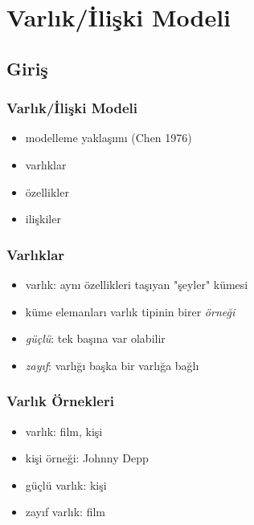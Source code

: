 \documentclass[dvipsnames]{beamer}
\theoremstyle{theorem}
\begin{document}
\section{Varlık/İlişki Modeli}

\subsection{Giriş}

\begin{frame}
  \frametitle{Varlık/İlişki Modeli}

  \begin{itemize}
    \item modelleme yaklaşımı (Chen 1976)

    \medskip
      \item varlıklar
      \item özellikler
      \item ilişkiler
  \end{itemize}
\end{frame}

\begin{frame}
  \frametitle{Varlıklar}

  \begin{itemize}
    \item \alert{varlık}: aynı özellikleri taşıyan "şeyler" kümesi
    \item küme elemanları varlık tipinin birer \emph{örneği}

    \medskip
    \item \emph{güçlü}: tek başına var olabilir
    \item \emph{zayıf}: varlığı başka bir varlığa bağlı
    \end{itemize}
\end{frame}

\begin{frame}
  \frametitle{Varlık Örnekleri}

    \begin{itemize}
      \item varlık: film, kişi
      \item kişi örneği: Johnny Depp

      \pause
      \medskip
      \item güçlü varlık: kişi
      \item zayıf varlık: film
    \end{itemize}
\end{frame}
\end{document}
